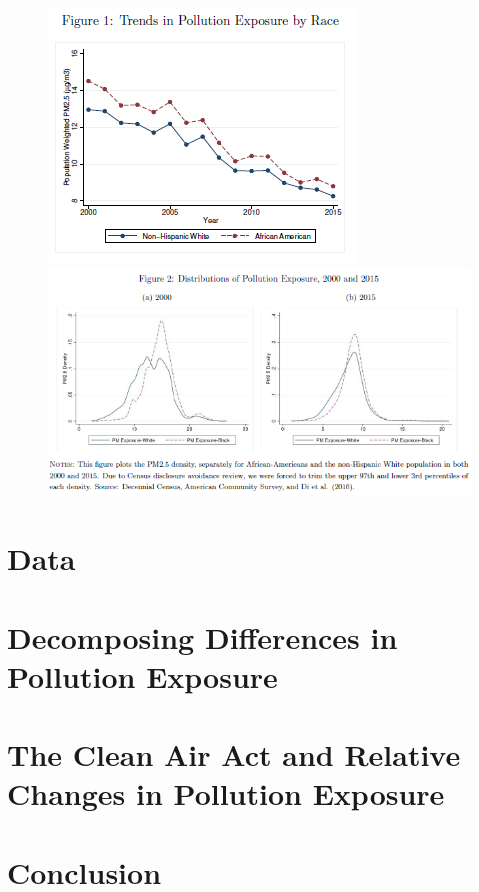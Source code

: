 \documentclass[dvipdfmx,11pt]{beamer}
\begin{document}
\begin{frame}{}
  \begin{figure}
    \centering
    \includegraphics[scale = .5]{F1.png}
    \includegraphics[scale = .5]{F2.png}
  \end{figure}
\end{frame}

\section{Data}
\frame{\sectionpage}
\begin{frame}{}

\end{frame}

\section{Decomposing Differences in Pollution Exposure}
\frame{\sectionpage}
\begin{frame}{}
  
\end{frame}

\section{The Clean Air Act and Relative Changes in Pollution Exposure}
\frame{\sectionpage}
\begin{frame}{}
  
\end{frame}

\section{Conclusion}
\frame{\sectionpage}
\begin{frame}{}
  
\end{frame}
\end{document}
